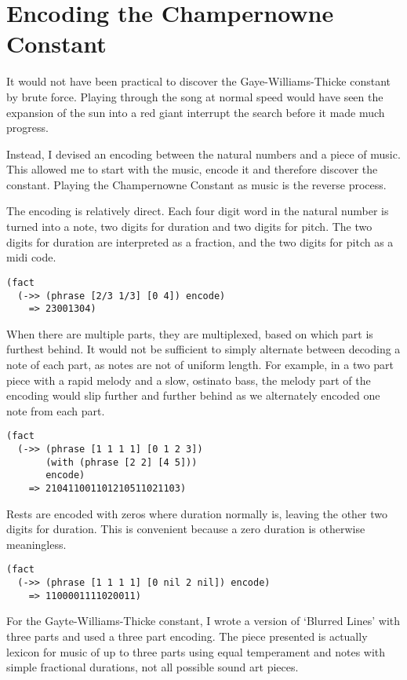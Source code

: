 \documentclass[numbers]{sigplanconf}
\begin{document}
\appendix
\section{Encoding the Champernowne Constant}

It would not have been practical to discover the Gaye-Williams-Thicke constant by brute force. Playing through the song at normal
speed would have seen the expansion of the sun into a red giant interrupt the search before it made much progress.

Instead, I devised an encoding between the natural numbers and a piece of music. This allowed me to start with the music, encode
it and therefore discover the constant. Playing the Champernowne Constant as music is the reverse process.

The encoding is relatively direct. Each four digit word in the natural number is turned into a note, two digits for duration and
two digits for pitch. The two digits for duration are interpreted as a fraction, and the two digits for pitch as a midi code.

\begin{verbatim}
(fact
  (->> (phrase [2/3 1/3] [0 4]) encode)
    => 23001304)
\end{verbatim}

When there are multiple parts, they are multiplexed, based on which part is furthest behind. It would not be sufficient to
simply alternate between decoding a note of each part, as notes are not of uniform length. For example, in a two part piece
with a rapid melody and a slow, ostinato bass, the melody part of the encoding would slip further and further behind as
we alternately encoded one note from each part.

\begin{verbatim}
(fact
  (->> (phrase [1 1 1 1] [0 1 2 3])
       (with (phrase [2 2] [4 5]))
       encode)
    => 210411001101210511021103)
\end{verbatim}

Rests are encoded with zeros where duration normally is, leaving the other two digits for duration.
This is convenient because a zero duration is otherwise meaningless.

\begin{verbatim}
(fact
  (->> (phrase [1 1 1 1] [0 nil 2 nil]) encode)
    => 1100001111020011)
\end{verbatim}

For the Gayte-Williams-Thicke constant, I wrote a version of `Blurred Lines' with three parts and used a three part encoding.
The piece presented is actually lexicon for music of up to three parts using equal temperament and notes with simple
fractional durations, not all possible sound art pieces.
\end{document}
